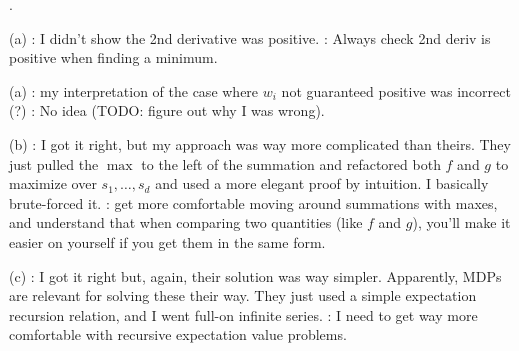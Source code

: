 \documentclass[11pt]{article}
\newcommand\myspace[1][]{\vspace{#1\bigskipamount}\Needspace{10\baselineskip}}
\newcommand\p{\Needspace{10\baselineskip} \noindent}
\begin{document}

\myspace
\p {}. 
\begin{compactitem}
	\item[(a)] : I didn't show the 2nd derivative was positive. : Always check 2nd deriv is positive when finding a minimum. 

	\item [(a)] : my interpretation of the case where $w_i$ not guaranteed positive was incorrect (?) : No idea (TODO: figure out why I was wrong). 
	
	\item [(b)] : I got it right, but my approach was way more complicated than theirs. They just pulled the $\max$ to the left of the summation and refactored both $f$ and $g$ to maximize over $s_1, \ldots, s_d$ and used a more elegant proof by intuition. I basically brute-forced it. : get more comfortable moving around summations with maxes, and understand that when comparing two quantities (like $f$ and $g$), you'll make it easier on yourself if you get them in the same form. 
	
	\item [(c)] : I got it right but, again, their solution was way simpler. Apparently, MDPs are relevant for solving these their way. They just used a simple expectation recursion relation, and I went full-on infinite series. : I need to get way more comfortable with recursive expectation value problems. 
\end{compactitem}
\end{document}
